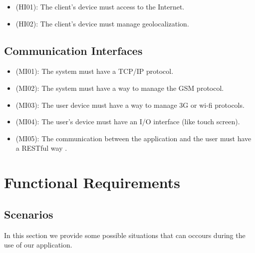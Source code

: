 \documentclass[a4paper,leqno]{book}
\begin{document}
\begin{itemize}
\item (HI01): The client's device must access to the Internet.
\item (HI02): The client's device must manage geolocalization. 
\end{itemize}

\subsection{Communication Interfaces}

\begin{itemize}
\item (MI01): The system must have a TCP/IP protocol.
\item (MI02): The system must have a way to manage the GSM protocol.
\item (MI03): The user device must have a way to manage 3G or wi-fi protocols.
\item (MI04): The user's device must have an I/O interface (like touch screen).
\item (MI05): The communication between the application and the user must have a RESTful way .
\end{itemize}

\section{Functional Requirements}

\subsection{Scenarios}
In this section we provide some possible situations that can occours during the use of our application.
\end{document}
